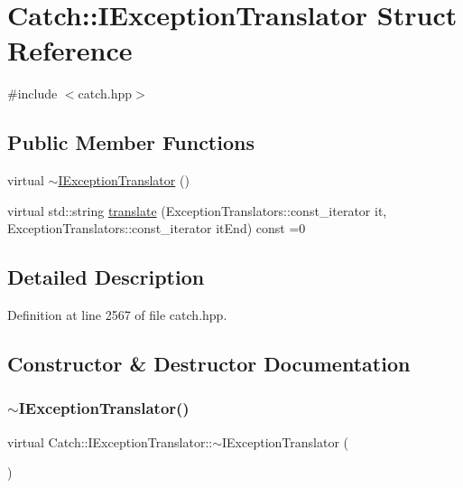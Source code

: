 \hypertarget{struct_catch_1_1_i_exception_translator}{}\section{Catch\+:\+:I\+Exception\+Translator Struct Reference}
\label{struct_catch_1_1_i_exception_translator}


{\ttfamily \#include $<$catch.\+hpp$>$}

\subsection*{Public Member Functions}
\begin{DoxyCompactItemize}
\item 
virtual \hyperlink{struct_catch_1_1_i_exception_translator_afa00bb6258c07591df472aadae05783f}{$\sim$\+I\+Exception\+Translator} ()
\item 
virtual std\+::string \hyperlink{struct_catch_1_1_i_exception_translator_a2a554b96ed5ed411e7c796b6b42837a5}{translate} (Exception\+Translators\+::const\+\_\+iterator it, Exception\+Translators\+::const\+\_\+iterator it\+End) const =0
\end{DoxyCompactItemize}


\subsection{Detailed Description}


Definition at line 2567 of file catch.\+hpp.



\subsection{Constructor \& Destructor Documentation}
\hypertarget{struct_catch_1_1_i_exception_translator_afa00bb6258c07591df472aadae05783f}{}\label{struct_catch_1_1_i_exception_translator_afa00bb6258c07591df472aadae05783f} 
\subsubsection{\texorpdfstring{$\sim$\+I\+Exception\+Translator()}{~IExceptionTranslator()}}
{\footnotesize\ttfamily virtual Catch\+::\+I\+Exception\+Translator\+::$\sim$\+I\+Exception\+Translator (\begin{DoxyParamCaption}{ }\end{DoxyParamCaption})\hspace{0.3cm}{\ttfamily [virtual]}}



